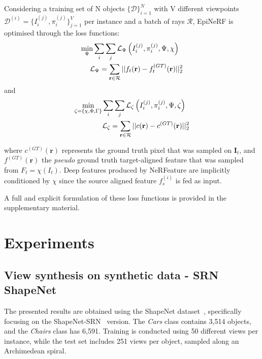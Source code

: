 Considering a training set of N objects $\{\mathcal{D}\}_{i=1}^{N}$ with V different viewpoints $\mathcal{D}^{(i)} = \{I_{i}^{(j)},\pi_{i}^{(j)}\}_{j=1}^{V}$ per instance and a batch of rays $\mathcal{R}$, EpiNeRF is optimised through the loss functions: 
\begin{equation}
\label{eq:nerfeature_loss}
\begin{split}
 \min_{\Psi} \sum_{i}\sum_{j}\mathcal{L}_{\Psi}\left(I_{i}^{(j)},\pi_{i}^{(j)},\Psi,\chi \right) \hspace{.2cm} \\ \hspace{.2cm}\mathcal{L}_{\Psi}= \sum_{\mathbf{r}\in\mathcal{R}} || f_{t}(\mathbf{r}) - f_{t}^{(GT)}(\mathbf{r}) ||_{2}^{2}
\end{split}
\end{equation}
and 
\begin{equation}
\label{eq:epinerf_loss}
\begin{split}
 \min_{\zeta=\{\chi,\Phi,\Gamma\}}\sum_{i}\sum_{j}\mathcal{L}_{\zeta}\left(I_{i}^{(j)},\pi_{i}^{(j)},\Psi,\zeta \right)\hspace{.2cm}  \\ \hspace{.2cm}\mathcal{L}_{\zeta}= \sum_{\mathbf{r}\in\mathcal{R}} || c(\mathbf{r}) - c^{(GT)}(\mathbf{r}) ||_{2}^{2}
\end{split}
\end{equation}


where $c^{(GT)}(\mathbf{r})$ represents the ground truth pixel that was sampled on $\mathbf{I}_{t}$, and $f^{(GT)}(\mathbf{r})$ the \textit{pseudo} ground truth target-aligned feature that was sampled from $F_{t}=\chi(I_{t})$. Deep features produced by NeRFeature are implicitly conditioned by $\chi$ since the source aligned feature $f_s^{(i)}$ is fed as input. 

A full and explicit formulation of these loss functions is provided in the supplementary material.

\section{Experiments}
\subsection{View synthesis on synthetic data - SRN ShapeNet}
The presented results are obtained using the ShapeNet dataset~\citep{chang2015shapenet}, specifically focusing on the ShapeNet-SRN~\citep{sitzmann2019scene} version. The \textit{Cars} class contains 3,514 objects, and the \textit{Chairs} class has 6,591. Training is conducted using 50 different views per instance, while the test set includes 251 views per object, sampled along an Archimedean spiral.\newline


